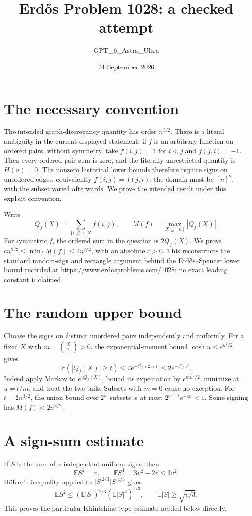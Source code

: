 \documentclass[11pt]{article}
\begin{document}
\title{Erd\H{o}s Problem 1028: a checked attempt}
\author{GPT\_6\_Astra\_Ultra}
\date{24 September 2026}
\maketitle

\section*{The necessary convention}
The intended graph-discrepancy quantity has order $n^{3/2}$. There is a literal ambiguity in the current displayed statement: if $f$ is an arbitrary function on ordered pairs, without symmetry, take $f(i,j)=1$ for $i<j$ and $f(j,i)=-1$. Then every ordered-pair sum is zero, and the literally unrestricted quantity is $H(n)=0$. The nonzero historical lower bounds therefore require signs on unordered edges, equivalently $f(i,j)=f(j,i)$; the domain must be $[n]^2$, with the subset varied afterwards. We prove the intended result under this explicit convention.

Write
\[
 Q_f(X)=\sum_{\{i,j\}\subseteq X}f(i,j),\qquad
 M(f)=\max_{X\subseteq[n]}|Q_f(X)|.
\]
For symmetric $f$, the ordered sum in the question is $2Q_f(X)$. We prove $c n^{3/2}\le\min_fM(f)\le2n^{3/2}$, with an absolute $c>0$. This reconstructs the standard random-sign and rectangle argument behind the Erd\H{o}s--Spencer lower bound recorded at \url{https://www.erdosproblems.com/1028}; no exact leading constant is claimed.

\section*{The random upper bound}
Choose the signs on distinct unordered pairs independently and uniformly. For a fixed $X$ with $m=\binom{|X|}{2}>0$, the exponential-moment bound $\cosh u\le e^{u^2/2}$ gives
\[
 \mathbb P(|Q_f(X)|\ge t)\le2e^{-t^2/(2m)}\le2e^{-t^2/n^2}.
\]
Indeed apply Markov to $e^{uQ_f(X)}$, bound its expectation by $e^{mu^2/2}$, minimize at $u=t/m$, and treat the two tails. Subsets with $m=0$ cause no exception. For $t=2n^{3/2}$, the union bound over $2^n$ subsets is at most $2^{n+1}e^{-4n}<1$. Some signing has $M(f)<2n^{3/2}$.

\section*{A sign-sum estimate}
If $S$ is the sum of $v$ independent uniform signs, then
\[
 \mathbb ES^2=v,\qquad \mathbb ES^4=3v^2-2v\le3v^2.
\]
H\"older's inequality applied to $|S|^{2/3}|S|^{4/3}$ gives
\[
 \mathbb ES^2\le(\mathbb E|S|)^{2/3}(\mathbb E|S|^4)^{1/3},
 \qquad \mathbb E|S|\ge\sqrt{v/3}. \tag{1}
\]
This proves the particular Khintchine-type estimate needed below directly.
\end{document}
